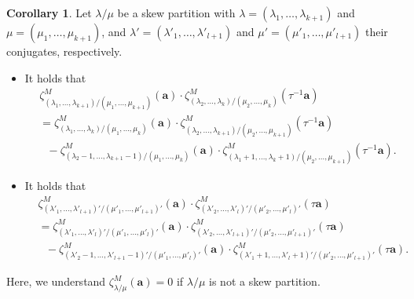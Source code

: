 \documentclass[12pt]{amsart}%
\theoremstyle{definition}
\newtheorem{cor}[theorem]{Corollary}
\newcommand{\ba}{\boldsymbol a}
\begin{document}
\begin{cor}
Let $\lambda/\mu$ be a skew partition with 
$\lambda=(\lambda_1,\ldots,\lambda_{k+1})$ and 
$\mu=(\mu_1,\ldots,\mu_{k+1})$,
and $\lambda'=(\lambda'_1,\ldots,\lambda'_{l+1})$ and 
$\mu'=(\mu'_1,\ldots,\mu'_{l+1})$ their conjugates, respectively.
\begin{itemize}
\item[(1)] 
It holds that  
\begin{align*}
& 
\zeta^M_{(\lambda_1,\ldots,\lambda_{k+1})/(\mu_1,\ldots,\mu_{k+1})}(\ba)
\cdot \zeta^M_{(\lambda_2,\ldots,\lambda_{k})/(\mu_2,\ldots,\mu_{k})}(\tau^{-1}\ba)\\
&=\zeta^M_{(\lambda_1,\ldots,\lambda_{k})/(\mu_1,\ldots,\mu_{k})}(\ba)
\cdot \zeta^M_{(\lambda_2,\ldots,\lambda_{k+1})/(\mu_2,\ldots,\mu_{k+1})}(\tau^{-1}\ba)
\\
&\ \ \ 
-\zeta^M_{(\lambda_2-1,\ldots,\lambda_{k+1}-1)/(\mu_1,\ldots,\mu_{k})}(\ba)
\cdot \zeta^M_{(\lambda_1+1,\ldots,\lambda_{k}+1)/(\mu_2,\ldots,\mu_{k+1})}(\tau^{-1}\ba).
\end{align*}
\item[(2)]  
It holds that  
\begin{align*}
& \zeta^M_{(\lambda'_1,\ldots,\lambda'_{l+1})'/(\mu'_1,\ldots,\mu'_{l+1})'}(\ba)
 \cdot \zeta^M_{(\lambda'_2,\ldots,\lambda'_{l})'/(\mu'_2,\ldots,\mu'_{l})'}(\tau\ba)
\\
&=\zeta^M_{(\lambda'_1,\ldots,\lambda'_{l})'/(\mu'_1,\ldots,\mu'_{l})'}(\ba)
 \cdot \zeta^M_{(\lambda'_2,\ldots,\lambda'_{l+1})'/(\mu'_2,\ldots,\mu'_{l+1})'}(\tau\ba)\\
&\ \ \ 
-\zeta^M_{(\lambda'_2-1,\ldots,\lambda'_{l+1}-1)'/(\mu'_1,\ldots,\mu'_{l})'}(\ba)
 \cdot  \zeta^M_{(\lambda'_1+1,\ldots,\lambda'_{l}+1)'/(\mu'_2,\ldots,\mu'_{l+1})'}(\tau\ba).
\end{align*}
\end{itemize}
Here, we understand $\zeta^{M}_{\lambda/\mu}(\ba)=0$
if $\lambda/\mu$ is not a skew partition.
\end{cor}
\end{document}
